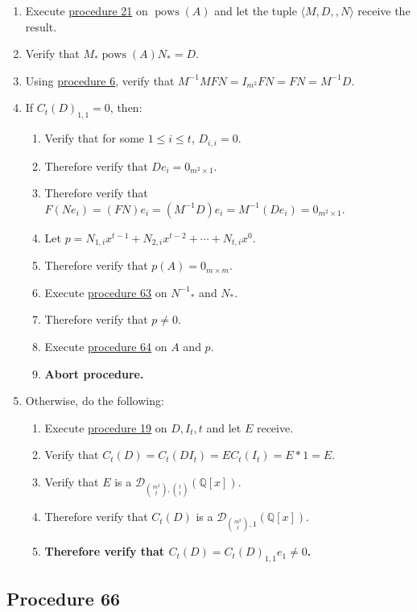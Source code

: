 \documentclass[twocolumn]{article}
\DeclareMathOperator{\pows}{pows}
\begin{document}
				\begin{enumerate}
					\item Execute \hyperref[sec:procedure 21]{procedure 21} on $\pows(A)$ and let the tuple $\langle M,D,,N\rangle$ receive the result.
					\item Verify that $M_*\pows(A)N_*=D$.
					\item Using \hyperref[sec:procedure 6]{procedure 6}, verify that $M^{-1}MFN=I_{m^2}FN=FN=M^{-1}D$.
					\item If ${C_t(D)}_{1,1}=0$, then:
					\begin{enumerate}
						\item Verify that for some $1\le i\le t$, $D_{i,i}=0$.
						\item Therefore verify that $De_i=0_{m^2\times 1}$.
						\item Therefore verify that $F(Ne_i)=(FN)e_i=(M^{-1}D)e_i=M^{-1}(De_i)=0_{m^2\times 1}$.
						\item Let $p=N_{1,i}x^{t-1}+N_{2,i}x^{t-2}+\cdots+N_{t,i}x^0$.
						\item Therefore verify that $p(A)=0_{m\times m}$.
						\item Execute \hyperref[sec:procedure 63]{procedure 63} on ${N^{-1}}_*$ and $N_*$.
						\item Therefore verify that $p\ne 0$.
						\item Execute \hyperref[sec:procedure 64]{procedure 64} on $A$ and $p$.
						\item \textbf{Abort procedure.}
					\end{enumerate}
					\item Otherwise, do the following:
					\begin{enumerate}
						\item Execute \hyperref[sec:procedure 19]{procedure 19} on $D,I_t,t$ and let $E$ receive.
						\item Verify that $C_t(D)=C_t(DI_t)=EC_t(I_t)=E*1=E$.
						\item Verify that $E$ is a $\mathcal{D}_{\binom{m^2}{t},\binom{t}{t}}(\mathbb{Q}[x])$.
						\item Therefore verify that $C_t(D)$ is a $\mathcal{D}_{\binom{m^2}{t},1}(\mathbb{Q}[x])$.
						\item \textbf{Therefore verify that $C_t(D)={C_t(D)}_{1,1}e_1\ne 0$.}
					\end{enumerate}
				\end{enumerate}
		\subsection{Procedure 66}\label{sec:procedure 66}
\end{document}

